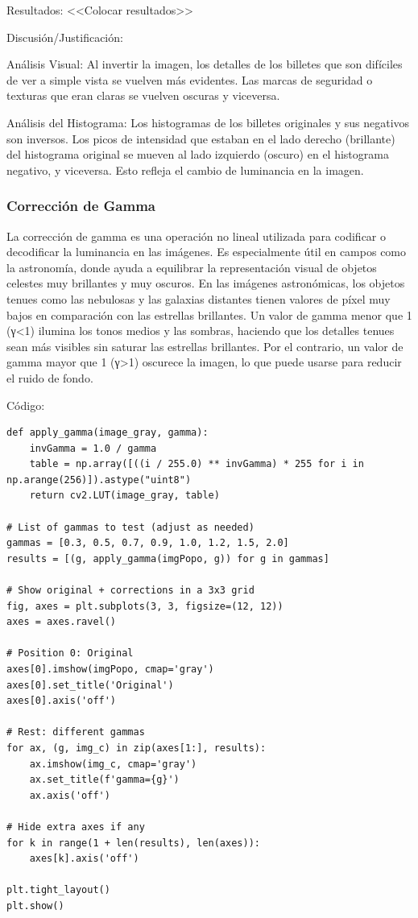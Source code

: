 \documentclass[12pt,letterpaper]{article}
\begin{document}
Resultados:
<<Colocar resultados>>


Discusión/Justificación:

Análisis Visual: Al invertir la imagen, los detalles de los billetes que son difíciles de ver a simple vista se vuelven más evidentes. Las marcas de seguridad o texturas que eran claras se vuelven oscuras y viceversa.

Análisis del Histograma: Los histogramas de los billetes originales y sus negativos son inversos. Los picos de intensidad que estaban en el lado derecho (brillante) del histograma original se mueven al lado izquierdo (oscuro) en el histograma negativo, y viceversa. Esto refleja el cambio de luminancia en la imagen.

\subsubsection{Corrección de Gamma}

La corrección de gamma es una operación no lineal utilizada para codificar o decodificar la luminancia en las imágenes. Es especialmente útil en campos como la astronomía, donde ayuda a equilibrar la representación visual de objetos celestes muy brillantes y muy oscuros.
En las imágenes astronómicas, los objetos tenues como las nebulosas y las galaxias distantes tienen valores de píxel muy bajos en comparación con las estrellas brillantes. Un valor de gamma menor que 1 (γ<1) ilumina los tonos medios y las sombras, haciendo que los detalles tenues sean más visibles sin saturar las estrellas brillantes. Por el contrario, un valor de gamma mayor que 1 (γ>1) oscurece la imagen, lo que puede usarse para reducir el ruido de fondo.


Código:
\begin{verbatim}
def apply_gamma(image_gray, gamma):
    invGamma = 1.0 / gamma
    table = np.array([((i / 255.0) ** invGamma) * 255 for i in np.arange(256)]).astype("uint8")
    return cv2.LUT(image_gray, table)

# List of gammas to test (adjust as needed)
gammas = [0.3, 0.5, 0.7, 0.9, 1.0, 1.2, 1.5, 2.0]
results = [(g, apply_gamma(imgPopo, g)) for g in gammas]

# Show original + corrections in a 3x3 grid
fig, axes = plt.subplots(3, 3, figsize=(12, 12))
axes = axes.ravel()

# Position 0: Original
axes[0].imshow(imgPopo, cmap='gray')
axes[0].set_title('Original')
axes[0].axis('off')

# Rest: different gammas
for ax, (g, img_c) in zip(axes[1:], results):
    ax.imshow(img_c, cmap='gray')
    ax.set_title(f'gamma={g}')
    ax.axis('off')

# Hide extra axes if any
for k in range(1 + len(results), len(axes)):
    axes[k].axis('off')

plt.tight_layout()
plt.show()
\end{verbatim}
\end{document}
